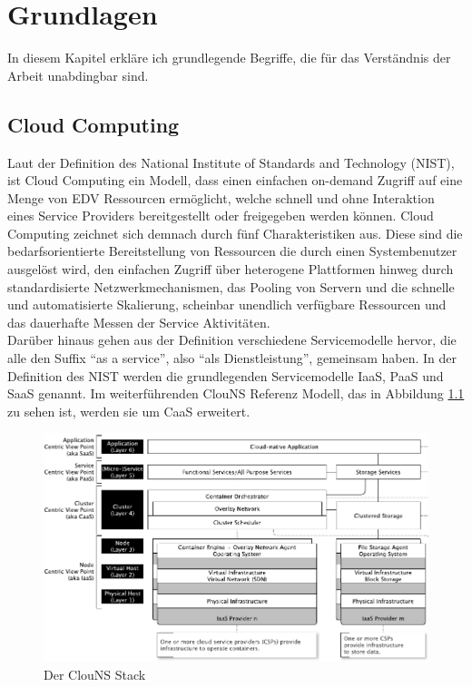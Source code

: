 \chapter{Grundlagen}
In diesem Kapitel erkläre ich grundlegende Begriffe, die für das Verständnis der Arbeit unabdingbar sind.

\section{Cloud Computing}
Laut der Definition des National Institute of Standards and Technology (NIST), ist Cloud Computing ein Modell, dass einen einfachen on-demand Zugriff auf eine Menge von EDV Ressourcen ermöglicht, welche schnell und ohne Interaktion eines Service Providers bereitgestellt oder freigegeben werden können\cite{mell_nist_2011}.
Cloud Computing zeichnet sich demnach durch fünf Charakteristiken aus. Diese sind die bedarfsorientierte Bereitstellung von Ressourcen die durch einen Systembenutzer ausgelöst wird, den einfachen Zugriff über heterogene Plattformen hinweg durch standardisierte Netzwerkmechanismen, das Pooling von Servern und die schnelle und automatisierte Skalierung, scheinbar unendlich verfügbare Ressourcen und das dauerhafte Messen der Service Aktivitäten. \\
Darüber hinaus gehen aus der Definition verschiedene Servicemodelle hervor, die alle den Suffix "`as a service"', also "`als Dienstleistung"', gemeinsam haben. In der Definition des NIST werden die grundlegenden Servicemodelle IaaS, PaaS und SaaS genannt. Im weiterführenden ClouNS Referenz Modell\cite{kratzke_clouns_2016}, das in Abbildung \ref{fig:clouNS} zu sehen ist, werden sie um CaaS erweitert. \\

\begin{figure}[H]
    \includegraphics[width=\textwidth]{img/ClouNS_Stack.png}
    \caption[Der ClouNS Stack]{Der ClouNS Stack\cite{kratzke_clouns_2016}}
    \label{fig:clouNS}
\end{figure}

